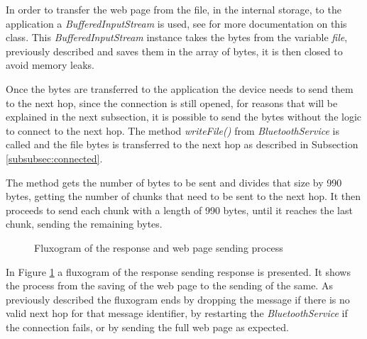 In order to transfer the web page from the file, in the internal storage, to the application a \textit{BufferedInputStream} is used, see \cite{bis} for more documentation on this class. This \textit{BufferedInputStream} instance takes the bytes from the variable \textit{file}, previously described and saves them in the array of bytes, it is then closed to avoid memory leaks.

Once the bytes are transferred to the application the device needs to send them to the next hop, since the connection is still opened, for reasons that will be explained in the next subsection, it is possible to send the bytes without the logic to connect to the next hop. The method \textit{writeFile()} from \textit{BluetoothService} is called and the file bytes is transferred to the next hop as described in Subsection \ref{subsubsec:connected}.

The method gets the number of bytes to be sent and divides that size by 990 bytes, getting the number of chunks that need to be sent to the next hop. It then proceeds to send each chunk with a length of 990 bytes, until it reaches the last chunk, sending the remaining bytes.

\begin{figure}[ht]
   \noindent{}
	\caption{\label{fig:rspsendflux} Fluxogram of the response and web page sending process}
\end{figure}

In Figure \ref{fig:rspsendflux} a fluxogram of the response sending response is presented. It shows the process from the saving of the web page to the sending of the same. As previously described the fluxogram ends by dropping the message if there is no valid next hop for that message identifier, by restarting the \textit{BluetoothService} if the connection fails, or by sending the full web page as expected.

